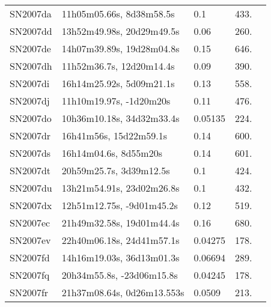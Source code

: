 \begin{longtable}{lllll}
         SN2007da &       11h05m05.66s, 8d38m58.5s &      0.1 &           433. &    \citet{2007CBET..990A...1:} \\
         SN2007dd &      13h52m49.98s, 20d29m49.5s &     0.06 &           260. &    \citet{2007CBET..990A...1:} \\
         SN2007de &      14h07m39.89s, 19d28m04.8s &     0.15 &           646. &    \citet{2007CBET..990A...1:} \\
         SN2007dh &       11h52m36.7s, 12d20m14.4s &     0.09 &           390. &    \citet{2007CBET..990A...1:} \\
         SN2007di &       16h14m25.92s, 5d09m21.1s &     0.13 &           558. &    \citet{2007CBET..990A...1:} \\
         SN2007dj &        11h10m19.97s, -1d20m20s &     0.11 &           476. &    \citet{2007CBET..990A...1:} \\
         SN2007do &      10h36m10.18s, 34d32m33.4s &  0.05135 &           224. &    \citet{2006SDSS5.C...0000:} \\
         SN2007dr &         16h41m56s, 15d22m59.1s &     0.14 &           600. &    \citet{2007CBET..990A...1:} \\
         SN2007ds &          16h14m04.6s, 8d55m20s &     0.14 &           601. &    \citet{2007CBET..990A...1:} \\
         SN2007dt &        20h59m25.7s, 3d39m12.5s &      0.1 &           424. &    \citet{2007CBET..990A...1:} \\
         SN2007du &      13h21m54.91s, 23d02m26.8s &      0.1 &           432. &    \citet{2007CBET..990A...1:} \\
         SN2007dx &      12h51m12.75s, -9d01m45.2s &     0.12 &           519. &    \citet{2007CBET..990A...1:} \\
         SN2007ec &      21h49m32.58s, 19d01m44.4s &     0.16 &           680. &    \citet{2007CBET..990A...1:} \\
         SN2007ev &      22h40m06.18s, 24d41m57.1s &  0.04275 &           178. &    \citet{2009ApJS..183..214M} \\
         SN2007fd &      14h16m19.03s, 36d13m01.3s &  0.06694 &           289. &    \citet{2005SDSS4.C...0000:} \\
         SN2007fq &      20h34m55.8s, -23d06m15.8s &  0.04245 &           178. &    \citet{2012ApJS..199...26H} \\
         SN2007fr &     21h37m08.64s, 0d26m13.553s &   0.0509 &           213. &    \citet{1999PASP..111..438F} \\

\end{longtable}
